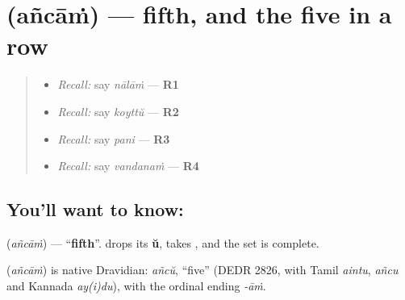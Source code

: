 \section[Practice]{ (añcāṁ) — fifth, and the five in a row}

\label{lesson:ML-C67-fifth}



\begin{quote}
\begin{itemize}
\raggedright
  \item \emph{Recall:} say \emph{nālāṁ} — \textbf{R1}
  \item \emph{Recall:} say \emph{koyttŭ} — \textbf{R2}
  \item \emph{Recall:} say \emph{pani} — \textbf{R3}
  \item \emph{Recall:} say \emph{vandanaṁ} — \textbf{R4}
\end{itemize}
\end{quote}

\subsection*{You'll want to know: }
\textbf{} (\emph{añcāṁ}) — \textquotedblleft{}\textbf{fifth}\textquotedblright{}. \textbf{} drops its \textbf{ŭ}, takes \textbf{}, and the set is complete.

\begin{cousinweb}
\textbf{} (\emph{añcāṁ}) is native Dravidian: \emph{añcŭ}, \textquotedblleft{}five\textquotedblright{} (DEDR 2826, with Tamil \emph{aintu}, \emph{añcu} and Kannada \emph{ay(i)du}), with the ordinal ending \emph{-āṁ}.
\end{cousinweb}

